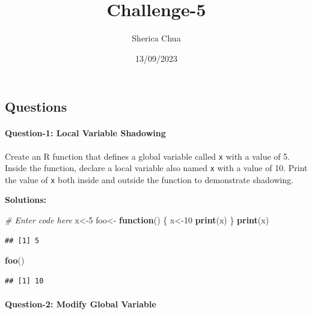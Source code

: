 \documentclass[
]{article}
\title{Challenge-5}
\author{Sherica Chua}
\date{13/09/2023}
\newenvironment{Shaded}{\begin{snugshade}}{\end{snugshade}}
\newcommand{\CommentTok}[1]{\textcolor[rgb]{0.56,0.35,0.01}{\textit{#1}}}
\newcommand{\ControlFlowTok}[1]{\textcolor[rgb]{0.13,0.29,0.53}{\textbf{#1}}}
\newcommand{\DecValTok}[1]{\textcolor[rgb]{0.00,0.00,0.81}{#1}}
\newcommand{\FunctionTok}[1]{\textcolor[rgb]{0.13,0.29,0.53}{\textbf{#1}}}
\newcommand{\NormalTok}[1]{#1}
\newcommand{\OtherTok}[1]{\textcolor[rgb]{0.56,0.35,0.01}{#1}}
\begin{document}
\maketitle

\hypertarget{questions}{%
\subsection{Questions}\label{questions}}

\hypertarget{question-1-local-variable-shadowing}{%
\paragraph{Question-1: Local Variable
Shadowing}\label{question-1-local-variable-shadowing}}

Create an R function that defines a global variable called \texttt{x}
with a value of 5. Inside the function, declare a local variable also
named \texttt{x} with a value of 10. Print the value of \texttt{x} both
inside and outside the function to demonstrate shadowing.

\textbf{Solutions:}

\begin{Shaded}
\begin{Highlighting}[]
\CommentTok{\# Enter code here}
\NormalTok{x}\OtherTok{\textless{}{-}}\DecValTok{5}
\NormalTok{foo}\OtherTok{\textless{}{-}} \ControlFlowTok{function}\NormalTok{() \{}
\NormalTok{  x}\OtherTok{\textless{}{-}}\DecValTok{10}
  \FunctionTok{print}\NormalTok{(x)}
\NormalTok{\}}
\FunctionTok{print}\NormalTok{(x)}
\end{Highlighting}
\end{Shaded}

\begin{verbatim}
## [1] 5
\end{verbatim}

\begin{Shaded}
\begin{Highlighting}[]
\FunctionTok{foo}\NormalTok{()}
\end{Highlighting}
\end{Shaded}

\begin{verbatim}
## [1] 10
\end{verbatim}

\hypertarget{question-2-modify-global-variable}{%
\paragraph{Question-2: Modify Global
Variable}\label{question-2-modify-global-variable}}
\end{document}
